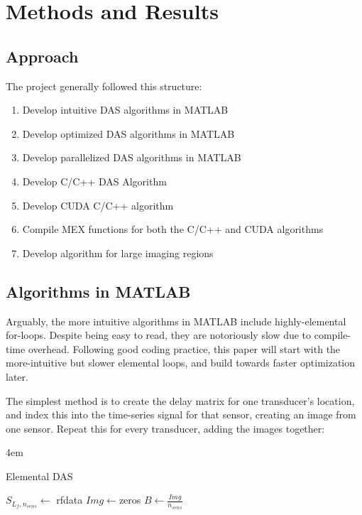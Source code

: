 \chapter{Methods and Results}
\label{chapter3:Methodology}
\graphicspath{{Chapter-3/graphics/}}

\section{Approach}
\label{chapter3:approach}

The project generally followed this structure:
\begin{enumerate}
    \item Develop intuitive DAS algorithms in MATLAB
    \item Develop optimized DAS algorithms in MATLAB
    \item Develop parallelized DAS algorithms in MATLAB
    \item Develop C/C++ DAS Algorithm
    \item Develop CUDA C/C++ algorithm
    \item Compile MEX functions for both the C/C++ and CUDA algorithms
    \item Develop algorithm for large imaging regions
\end{enumerate}

\section{Algorithms in MATLAB}
\label{chapter3:matlab_code}

Arguably, the more intuitive algorithms in MATLAB include highly-elemental for-loops. Despite being easy to read, they are notoriously slow due to compile-time overhead. Following good coding practice, this paper will start with the more-intuitive but slower elemental loops, and build towards faster optimization later.

The simplest method is to create the delay matrix for one transducer's location, and index this into the time-series signal for that sensor, creating an image from one sensor. Repeat this for every transducer, adding the images together:

\begin{algorithm} [H]
\parindent4em
\normalem
\caption{Elemental DAS}\label{algo:elemental_das}
    $S_{L_f,n_{sens}} \gets$ rfdata\;
    $Img \gets $zeros\;
    $B \gets \frac{Img}{n_{sens}}$\;
\end{algorithm}


